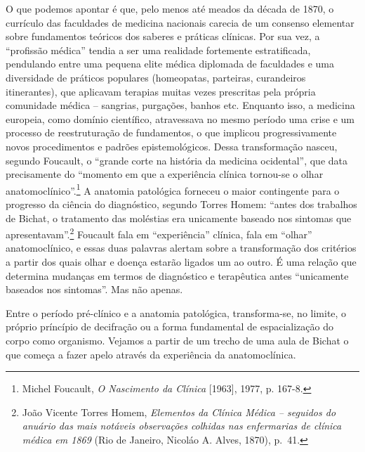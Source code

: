 O que podemos apontar é que, pelo menos até meados da década de 1870, o
currículo das faculdades de medicina nacionais carecia de um consenso
elementar sobre fundamentos teóricos dos saberes e práticas clínicas.
Por sua vez, a ``profissão médica'' tendia a ser uma realidade
fortemente estratificada, pendulando entre uma pequena elite médica
diplomada de faculdades e uma diversidade de práticos populares
(homeopatas, parteiras, curandeiros itinerantes), que aplicavam terapias
muitas vezes prescritas pela própria comunidade médica -- sangrias,
purgações, banhos etc. Enquanto isso, a medicina europeia, como domínio
científico, atravessava no mesmo período uma crise e um processo de
reestruturação de fundamentos, o que implicou progressivamente novos
procedimentos e padrões epistemológicos. Dessa transformação nasceu,
segundo Foucault, o ``grande corte na história da medicina ocidental'',
que data precisamente do ``momento em que a experiência clínica
tornou-se o olhar anatomoclínico''.\footnote{Michel Foucault, \emph{O
  Nascimento da Clínica} {[}1963{]}, 1977, p. 167-8.} A anatomia
patológica forneceu o maior contingente para o progresso da ciência do
diagnóstico, segundo Torres Homem: ``antes dos trabalhos de Bichat, o
tratamento das moléstias era unicamente baseado nos sintomas que
apresentavam''.\footnote{João Vicente Torres Homem, \emph{Elementos da
  Clínica Médica -- seguidos do anuário das mais notáveis observações
  colhidas nas enfermarias de clínica médica em 1869} (Rio de Janeiro,
  Nicoláo A. Alves, 1870), p.~41.} Foucault fala em ``experiência''
clínica, fala em ``olhar'' anatomoclínico, e essas duas palavras alertam
sobre a transformação dos critérios a partir dos quais olhar e doença
estarão ligados um ao outro. É uma relação que determina mudanças em
termos de diagnóstico e terapêutica antes ``unicamente baseados nos
sintomas''. Mas não apenas.

Entre o período pré-clínico e a anatomia patológica, transforma-se, no
limite, o próprio príncípio de decifração ou a forma fundamental de
espacialização do corpo como organismo. Vejamos a partir de um trecho de
uma aula de Bichat o que começa a fazer apelo através da experiência da
anatomoclínica.


